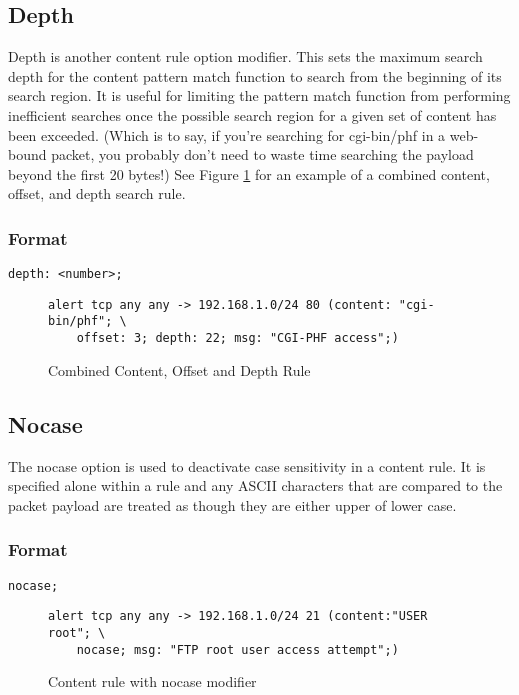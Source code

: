 \documentclass[english]{report}
\begin{document}
\subsection{Depth}

Depth is another content rule option modifier. This sets the maximum
search depth for the content pattern match function to search from
the beginning of its search region. It is useful for limiting the
pattern match function from performing inefficient searches once the
possible search region for a given set of content has been exceeded.
(Which is to say, if you're searching for cgi-bin/phf
in a web-bound packet, you probably don't need to waste time searching
the payload beyond the first 20 bytes!) See Figure \ref{combined rule with offset and depth}
for an example of a combined content, offset, and depth search rule.


\subsubsection{Format}

\begin{verbatim}
depth: <number>;
\end{verbatim}
%
\begin{figure}[!hbpt]
\begin{verbatim}
alert tcp any any -> 192.168.1.0/24 80 (content: "cgi-bin/phf"; \
    offset: 3; depth: 22; msg: "CGI-PHF access";)
\end{verbatim}

\caption{\label{combined rule with offset and depth} Combined Content, Offset
and Depth Rule}
\end{figure}

\subsection{Nocase}

The nocase option is used to deactivate case sensitivity in a content
rule. It is specified alone within a rule and any ASCII characters
that are compared to the packet payload are treated as though they
are either upper of lower case.


\subsubsection{Format}

\begin{verbatim}
nocase;
\end{verbatim}
%
\begin{figure}[!hbpt]
\begin{verbatim}
alert tcp any any -> 192.168.1.0/24 21 (content:"USER root"; \
    nocase; msg: "FTP root user access attempt";)
\end{verbatim}

\caption{\label{content nocase mod example}Content rule with nocase modifier}
\end{figure}
\end{document}
